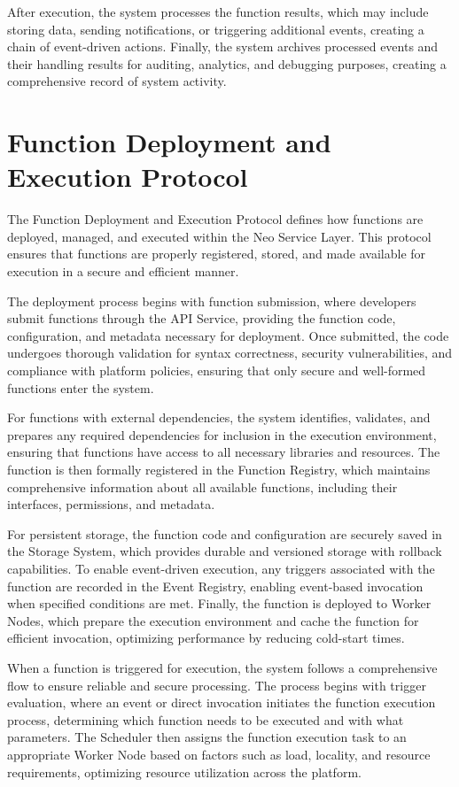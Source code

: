 \documentclass[11pt]{article}
\begin{document}
After execution, the system processes the function results, which may include storing data, sending notifications, or triggering additional events, creating a chain of event-driven actions. Finally, the system archives processed events and their handling results for auditing, analytics, and debugging purposes, creating a comprehensive record of system activity.

\section{Function Deployment and Execution Protocol}
\label{subsec:function-protocol-spec}

The Function Deployment and Execution Protocol defines how functions are deployed, managed, and executed within the Neo Service Layer. This protocol ensures that functions are properly registered, stored, and made available for execution in a secure and efficient manner.


The deployment process begins with function submission, where developers submit functions through the API Service, providing the function code, configuration, and metadata necessary for deployment. Once submitted, the code undergoes thorough validation for syntax correctness, security vulnerabilities, and compliance with platform policies, ensuring that only secure and well-formed functions enter the system.

For functions with external dependencies, the system identifies, validates, and prepares any required dependencies for inclusion in the execution environment, ensuring that functions have access to all necessary libraries and resources. The function is then formally registered in the Function Registry, which maintains comprehensive information about all available functions, including their interfaces, permissions, and metadata.

For persistent storage, the function code and configuration are securely saved in the Storage System, which provides durable and versioned storage with rollback capabilities. To enable event-driven execution, any triggers associated with the function are recorded in the Event Registry, enabling event-based invocation when specified conditions are met. Finally, the function is deployed to Worker Nodes, which prepare the execution environment and cache the function for efficient invocation, optimizing performance by reducing cold-start times.

When a function is triggered for execution, the system follows a comprehensive flow to ensure reliable and secure processing. The process begins with trigger evaluation, where an event or direct invocation initiates the function execution process, determining which function needs to be executed and with what parameters. The Scheduler then assigns the function execution task to an appropriate Worker Node based on factors such as load, locality, and resource requirements, optimizing resource utilization across the platform.
\end{document}
